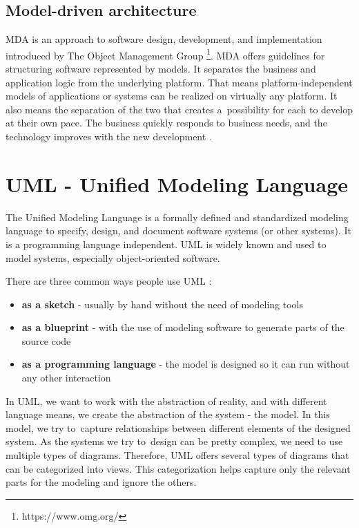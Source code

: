 \subsection*{Model-driven architecture}

MDA is an approach to software design, development, and implementation introduced by The Object Management Group \footnote{https://www.omg.org/}. MDA offers guidelines for structuring software represented by models. It separates the business and application logic from the underlying platform. That means platform-independent models of applications or systems can be realized on virtually any platform. It also means the separation of the two that creates a~possibility for each to develop at their own pace. The business quickly responds to business needs, and the technology improves with the new development \cite{mda}.







\section{UML - Unified Modeling Language}
The Unified Modeling Language is a formally defined and standardized modeling language to specify, design, and document software systems (or other systems). It is a programming language independent. UML is widely known and used to model systems, especially object-oriented software. 

There are three common ways people use UML \cite{learningUML}:
\begin{itemize}
    \item \textbf{as a sketch} - usually by hand without the need of modeling tools
    \item \textbf{as a blueprint} - with the use of modeling software to generate parts of the source code
    \item \textbf{as a programming language} - the model is designed so it can run without any other interaction
\end{itemize}

In UML, we want to work with the abstraction of reality, and with different language means, we create the abstraction of the system - the model. In this model, we try to~capture relationships between different elements of the designed system. As the systems we try to~design can be pretty complex, we need to use multiple types of diagrams. Therefore, UML offers several types of diagrams that can be categorized into views. This categorization helps capture only the relevant parts for the modeling and ignore the others. 


